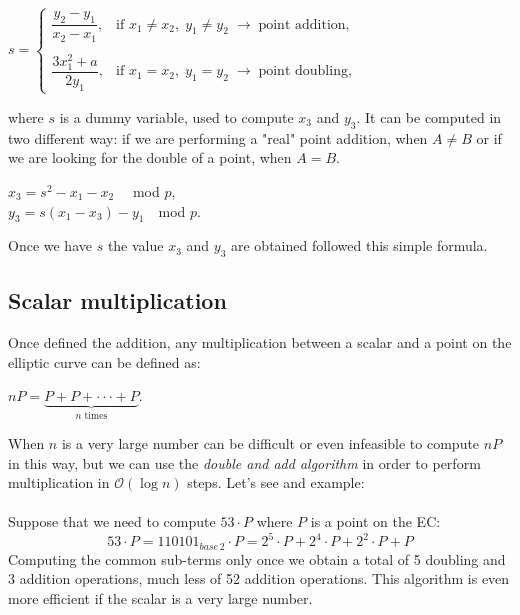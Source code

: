 \begin{center} 
	$s=\begin{cases} \dfrac{y_2-y_1}{x_2-x_1}, & \mbox{if } x_1\neq x_2, \; y_1\neq y_2 \;\rightarrow \; \text{point addition},\\ \\ \dfrac{3x_1^2+a}{2y_1}, & \mbox{if } x_1= x_2, \; y_1= y_2 \;\rightarrow \; \text{point doubling}, \end{cases}$
\end{center}
where $s$ is a dummy variable, used to compute $x_3$ and $y_3$. It can be computed in two different way: if we are performing a "real" point addition, when $A\neq B$ or if we are looking for the double of a point, when $A= B$.
\begin{center} 
	$ x_3=s^2-x_1-x_2  \quad$ mod $p$,\\
	$y_3=s(x_1-x_3)-y_1  \quad$mod $p$.
\end{center}
Once we have $s$ the value $x_3$ and $y_3$ are obtained followed this simple formula.


\subsection{Scalar multiplication}
Once defined the addition, any multiplication between a scalar and a point on the elliptic curve can be defined as:
\begin{center} 
	$ nP=\underbrace{
		P+P+\cdot \cdot \cdot+P
	}_{n\text{ times}}$.
\end{center}
When $n$ is a very large number can be difficult or even infeasible to compute $nP$ in this way, but we can use the \textit{double and add algorithm} in order to perform multiplication in $\mathcal{O}(\log{}n)$ steps. Let's see and example:
\\ \\
Suppose that we need to compute $53 \cdot P$ where $P$ is a point on the EC:
\begin{equation*}
53 \cdot P = 110101_{base\, 2} \cdot P = 2^{5}\cdot P + 2^{4}\cdot P + 2^{2}\cdot P + P
\end{equation*}
Computing the common sub-terms only once we obtain a total of 5 doubling and 3 addition operations, much less of 52 addition operations. This algorithm is even more efficient if the scalar is a very large number.

